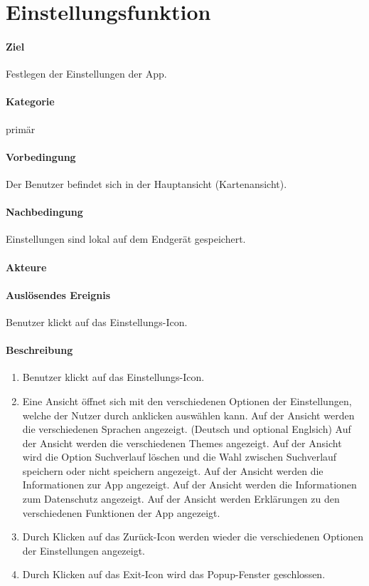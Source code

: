 \section{Einstellungsfunktion}
\label{Einstellungsfunktion}
\paragraph{Ziel}
Festlegen der Einstellungen der App.
\paragraph{Kategorie}
primär
\paragraph{Vorbedingung}
Der Benutzer befindet sich in der Hauptansicht (Kartenansicht).
\paragraph{Nachbedingung}
Einstellungen sind lokal auf dem Endgerät gespeichert.
\paragraph{Akteure}

\paragraph{Auslösendes Ereignis}
Benutzer klickt auf das Einstellungs-Icon.
\paragraph{Beschreibung}
\begin{enumerate}
    \item Benutzer klickt auf das Einstellungs-Icon.
    \item Eine Ansicht öffnet sich mit den verschiedenen Optionen der Einstellungen, welche der Nutzer durch anklicken auswählen kann.
     Auf der Ansicht werden die verschiedenen Sprachen angezeigt. (Deutsch und optional Englsich)
     Auf der Ansicht werden die verschiedenen Themes angezeigt.
     Auf der Ansicht wird die Option Suchverlauf löschen und die Wahl zwischen Suchverlauf speichern oder nicht speichern angezeigt.
     Auf der Ansicht werden die Informationen zur App angezeigt.
     Auf der Ansicht werden die Informationen zum Datenschutz angezeigt.
     Auf der Ansicht werden Erklärungen zu den verschiedenen Funktionen der App angezeigt.
    \item Durch Klicken auf das Zurück-Icon werden wieder die verschiedenen Optionen der Einstellungen angezeigt.
    \item Durch Klicken auf das Exit-Icon wird das Popup-Fenster geschlossen.
\end{enumerate}